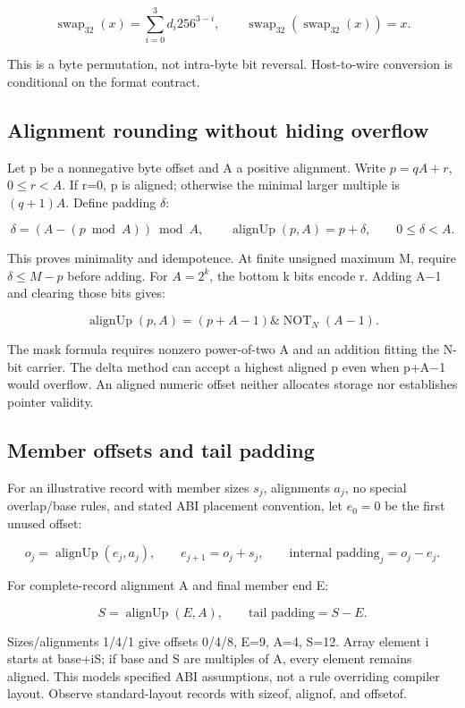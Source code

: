 \[
\operatorname{swap}_{32}(x)=\sum_{i=0}^{3}d_i256^{3-i},\qquad
\operatorname{swap}_{32}(\operatorname{swap}_{32}(x))=x.
\]

This is a byte permutation, not intra-byte bit reversal. Host-to-wire conversion is conditional on the format contract.

\subsection{Alignment rounding without hiding overflow}\label{01-foundations-i-ch011-alignment-rounding-without-hiding-overflow}

Let p be a nonnegative byte offset and A a positive alignment. Write \(p=qA+r\), \(0\le r<A\). If r=0, p is aligned; otherwise the minimal larger multiple is \((q+1)A\). Define padding \(\delta\):

\[
\delta=(A-(p\bmod A))\bmod A,\qquad
\operatorname{alignUp}(p,A)=p+\delta,\qquad 0\le\delta<A.
\]

This proves minimality and idempotence. At finite unsigned maximum M, require \(\delta\le M-p\) before adding. For \(A=2^k\), the bottom k bits encode r. Adding A−1 and clearing those bits gives:

\[
\operatorname{alignUp}(p,A)=(p+A-1)\mathbin{\&}\operatorname{NOT}_N(A-1).
\]

The mask formula requires nonzero power-of-two A and an addition fitting the N-bit carrier. The delta method can accept a highest aligned p even when p+A−1 would overflow. An aligned numeric offset neither allocates storage nor establishes pointer validity.

\subsection{Member offsets and tail padding}\label{01-foundations-i-ch011-member-offsets-and-tail-padding}

For an illustrative record with member sizes \(s_j\), alignments \(a_j\), no special overlap/base rules, and stated ABI placement convention, let \(e_0=0\) be the first unused offset:

\[
o_j=\operatorname{alignUp}(e_j,a_j),\qquad
e_{j+1}=o_j+s_j,\qquad
\text{internal padding}_j=o_j-e_j.
\]

For complete-record alignment A and final member end E:

\[
S=\operatorname{alignUp}(E,A),\qquad
\text{tail padding}=S-E.
\]

Sizes/alignments 1/4/1 give offsets 0/4/8, E=9, A=4, S=12. Array element i starts at base+iS; if base and S are multiples of A, every element remains aligned. This models specified ABI assumptions, not a rule overriding compiler layout. Observe standard-layout records with sizeof, alignof, and offsetof.

